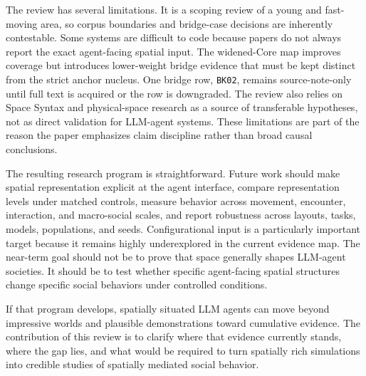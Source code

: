 \documentclass[
  twocolumn]{article}
\begin{document}
The review has several limitations. It is a scoping review of a young
and fast-moving area, so corpus boundaries and bridge-case decisions are
inherently contestable. Some systems are difficult to code because
papers do not always report the exact agent-facing spatial input. The
widened-Core map improves coverage but introduces lower-weight bridge
evidence that must be kept distinct from the strict anchor nucleus. One
bridge row, \texttt{BK02}, remains source-note-only until full text is
acquired or the row is downgraded. The review also relies on Space
Syntax and physical-space research as a source of transferable
hypotheses, not as direct validation for LLM-agent systems. These
limitations are part of the reason the paper emphasizes claim discipline
rather than broad causal conclusions.

The resulting research program is straightforward. Future work should
make spatial representation explicit at the agent interface, compare
representation levels under matched controls, measure behavior across
movement, encounter, interaction, and macro-social scales, and report
robustness across layouts, tasks, models, populations, and seeds.
Configurational input is a particularly important target because it
remains highly underexplored in the current evidence map. The near-term
goal should not be to prove that space generally shapes LLM-agent
societies. It should be to test whether specific agent-facing spatial
structures change specific social behaviors under controlled conditions.

If that program develops, spatially situated LLM agents can move beyond
impressive worlds and plausible demonstrations toward cumulative
evidence. The contribution of this review is to clarify where that
evidence currently stands, where the gap lies, and what would be
required to turn spatially rich simulations into credible studies of
spatially mediated social behavior.
\end{document}

